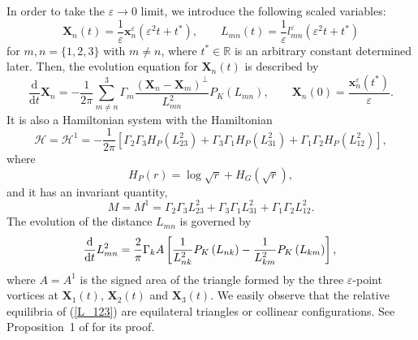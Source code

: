 \documentclass{article}
\theoremstyle{definition}
\begin{document}
In order to take the $\varepsilon \rightarrow 0$ limit, we introduce the following scaled variables:
\begin{equation}
{\bm X}_n(t) = \frac{1}{\varepsilon} {\bm x}_n^\varepsilon(\varepsilon^2 t + t^\ast ), \qquad L_{mn}(t) =  \frac{1}{\varepsilon} l_{mn}^\varepsilon (\varepsilon^2 t + t^\ast)  \label{scaled}
\end{equation}
for $m, n = \{ 1, 2, 3 \}$ with $m \neq n$, where $t^\ast\in \mathbb{R}$ is an arbitrary constant determined later. Then, the evolution equation for ${\bm X}_n(t)$ is described by 
\begin{equation}
\frac{\mbox{d}}{\mbox{d}t} {\bm X}_n = -\frac{1}{2\pi} \sum_{m\neq n}^3 \Gamma_m \frac{( {\bm X}_n - {\bm X}_m )^\perp}{L_{mn}^2} P_K\left( L_{mn} \right), \qquad {\bm X}_n(0) = \frac{{\bm x}_n^\varepsilon(t^\ast)}{\varepsilon}.  \label{XEP-PV}
\end{equation}
It  is also a Hamiltonian system with the Hamiltonian 
\begin{equation}
\mathscr{H} = \mathscr{H}^1 = - \frac{1}{2\pi} \left[ \Gamma_2 \Gamma_3 H_P\left( L_{23}^2 \right) + \Gamma_3 \Gamma_1 H_P\left( L_{31}^2 \right) + \Gamma_1 \Gamma_2 H_P\left( L_{12}^2 \right) \right],  \label{H}
\end{equation}
where 
\begin{equation}
H_P(r) = \log{\sqrt{r}} + H_G \left( \sqrt{r} \right),
\label{H_P}
\end{equation}
and it has an invariant quantity, 
\begin{equation}
M = M^1 = \Gamma_2 \Gamma_3 L_{23}^2 + \Gamma_3 \Gamma_1 L_{31}^2 + \Gamma_1 \Gamma_2 L_{12}^2.  \label{M}
\end{equation}
The evolution of the distance $L_{mn}$ is governed by
\begin{equation}
\frac{\mbox{d}}{\mbox{d}t} L_{mn}^2 = \frac{2}{\pi} \Gamma_k A \left[ \frac{1}{L_{nk}^2} P_K \left( L_{nk} \right) - \frac{1}{L_{km}^2} P_K \left( L_{km} \right) \right], \label{L_123} \\
\end{equation}
where $A = A^1$ is the signed area of the triangle formed by the three $\varepsilon$-point vortices at ${\bm X}_1(t)$, ${\bm X}_2(t)$ and ${\bm X}_3(t)$. We easily observe that the relative equilibria of (\ref{L_123}) are equilateral triangles or collinear configurations.  See Proposition~1 of \cite{G.2} for its proof.
\end{document}

